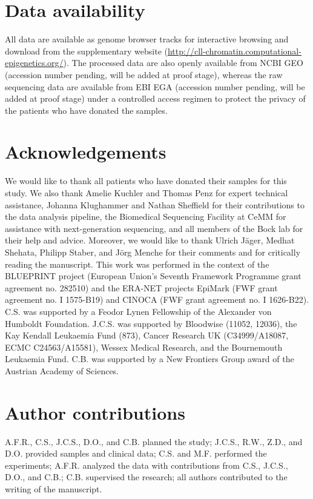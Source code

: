 \documentclass[10pt,]{article}
\begin{document}
\section{Data availability}\label{data-availability}

All data are available as genome browser tracks for interactive browsing
and download from the supplementary website
(\url{http://cll-chromatin.computational-epigenetics.org/}). The
processed data are also openly available from NCBI GEO (accession number
pending, will be added at proof stage), whereas the raw sequencing data
are available from EBI EGA (accession number pending, will be added at
proof stage) under a controlled access regimen to protect the privacy of
the patients who have donated the samples.

\section{Acknowledgements}\label{acknowledgements}

We would like to thank all patients who have donated their samples for
this study. We also thank Amelie Kuchler and Thomas Penz for expert
technical assistance, Johanna Klughammer and Nathan Sheffield for their
contributions to the data analysis pipeline, the Biomedical Sequencing
Facility at CeMM for assistance with next-generation sequencing, and all
members of the Bock lab for their help and advice. Moreover, we would
like to thank Ulrich Jäger, Medhat Shehata, Philipp Staber, and Jörg
Menche for their comments and for critically reading the manuscript.
This work was performed in the context of the BLUEPRINT project
(European Union's Seventh Framework Programme grant agreement no.
282510) and the ERA-NET projects EpiMark (FWF grant agreement no. I
1575-B19) and CINOCA (FWF grant agreement no. I 1626-B22). C.S. was
supported by a Feodor Lynen Fellowship of the Alexander von Humboldt
Foundation. J.C.S. was supported by Bloodwise (11052, 12036), the Kay
Kendall Leukaemia Fund (873), Cancer Research UK (C34999/A18087, ECMC
C24563/A15581), Wessex Medical Research, and the Bournemouth Leukaemia
Fund. C.B. was supported by a New Frontiers Group award of the Austrian
Academy of Sciences.

\section{Author contributions}\label{author-contributions}

A.F.R., C.S., J.C.S., D.O., and C.B. planned the study; J.C.S., R.W.,
Z.D., and D.O. provided samples and clinical data; C.S. and M.F.
performed the experiments; A.F.R. analyzed the data with contributions
from C.S., J.C.S., D.O., and C.B.; C.B. supervised the research; all
authors contributed to the writing of the manuscript.
\end{document}
